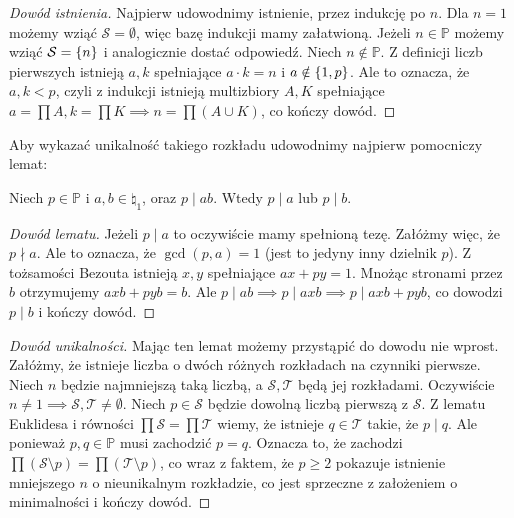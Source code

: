 \begin{proof}[Dowód istnienia]
	Najpierw udowodnimy istnienie, przez indukcję po \(n\).
	Dla \(n = 1\) możemy wziąć \(\mathcal S = \emptyset\), więc bazę indukcji mamy załatwioną.
	Jeżeli \(n \in \mathbb P\) możemy wziąć \(\mathcal S = \set{n}\) i analogicznie dostać odpowiedź.
	Niech \(n \notin \mathbb P\). Z definicji liczb pierwszych istnieją \(a, k\) spełniające
	\(a \cdot k = n\) i \(a \notin \set{1, p}\). Ale to oznacza, że \(a, k < p\),
	czyli z indukcji istnieją multizbiory \(A, K\) spełniające \(a = \prod A, k = \prod K
	\implies n = \prod (A \cup K)\), co kończy dowód.
\end{proof}
Aby wykazać unikalność takiego rozkładu udowodnimy najpierw pomocniczy lemat:
\begin{lemma}
	\label{nt:lemateuklidesa}
	Niech \(p \in \mathbb P\) i \(a, b \in \natural_1\), oraz \(p \mid ab\).
	Wtedy \(p \mid a\) lub \(p \mid b\).
\end{lemma}
\begin{proof}[Dowód lematu]
	Jeżeli \(p \mid a\) to oczywiście mamy spełnioną tezę.
	Załóżmy więc, że \(p \nmid a\).
	Ale to oznacza, że \(\gcd(p, a) = 1\) (jest to jedyny inny dzielnik \(p\)).
	Z tożsamości Bezouta istnieją \(x, y\) spełniające \(ax + py = 1\).
	Mnożąc stronami przez \(b\) otrzymujemy \(axb + pyb = b\).
	Ale \(p \mid ab \implies p \mid axb \implies p \mid axb+pyb\), co dowodzi
	\(p \mid b\) i kończy dowód.
\end{proof}
\begin{proof}[Dowód unikalności]
	Mając ten lemat możemy przystąpić do dowodu nie wprost.
	Załóżmy, że istnieje liczba o dwóch różnych rozkładach na czynniki pierwsze.
	Niech \(n\) będzie najmniejszą taką liczbą, a \(\mathcal S, \mathcal T\) będą jej rozkładami.
	Oczywiście \(n \neq 1 \implies \mathcal S, \mathcal T \neq \emptyset\).
	Niech \(p \in \mathcal S\) będzie dowolną liczbą pierwszą z \(\mathcal S\). Z lematu Euklidesa i
	równości \(\prod \mathcal S = \prod \mathcal T\) wiemy, że istnieje \(q \in \mathcal T\) takie, że \(p \mid q\).
	Ale ponieważ \(p, q\in \mathbb P\) musi zachodzić \(p = q\).
	Oznacza to, że zachodzi \(\prod (\mathcal S \setminus{p}) = \prod (\mathcal T \setminus{p})\), co wraz z faktem, że \(p \geq 2\)
	pokazuje istnienie mniejszego \(n\) o nieunikalnym rozkładzie, co jest sprzeczne z założeniem
	o minimalności i kończy dowód.
\end{proof}

